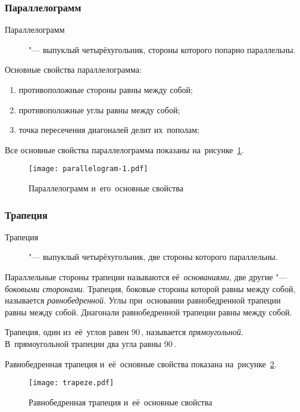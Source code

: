 \documentclass[]{scrartcl}
\begin{document}
\subsubsection{Параллелограмм}
\begin{description}
	\item[Параллелограмм] "--- выпуклый четырёхугольник, стороны которого попарно параллельны.
\end{description} 
Основные свойства параллелограмма:
\begin{enumerate}
	\item противоположные стороны равны между собой;
	\item противоположные углы равны между собой;
	\item точка пересечения диагоналей делит их~пополам;
	\end{enumerate}
Все основные свойства параллелограмма показаны на~рисунке~\ref{fig:parallelogram-1}.

\begin{figure}[ht]
	\centering %
	\texttt{[image: parallelogram-1.pdf]}
	\caption{Параллелограмм и~его~основные свойства}\label{fig:parallelogram-1}
\end{figure}

\subsubsection{Трапеция}
\begin{description}
	\item[Трапеция] "--- выпуклый четырёхугольник, две стороны которого параллельны.
\end{description}
Параллельные стороны трапеции называются её~\emph{основаниями}, две другие "--- \emph{боковыми сторонами}. Трапеция, боковые стороны которой равны между собой, называется \emph{равнобедренной}. Углы при~основании равнобедренной трапеции равны между собой. Диагонали равнобедренной трапеции равны между собой. 

Трапеция, один из~её~углов равен 90\,\textdegree, называется \emph{прямоугольной}. В~прямоугольной трапеции два угла равны 90\,\textdegree.

Равнобедренная трапеция и~её~основные свойства показана на~рисунке~\ref{fig:trapeze}.

\begin{figure}[ht]
	\centering %
	\texttt{[image: trapeze.pdf]}
	\caption{Равнобедренная трапеция и~её~основные свойства}\label{fig:trapeze}
\end{figure}
\end{document}
